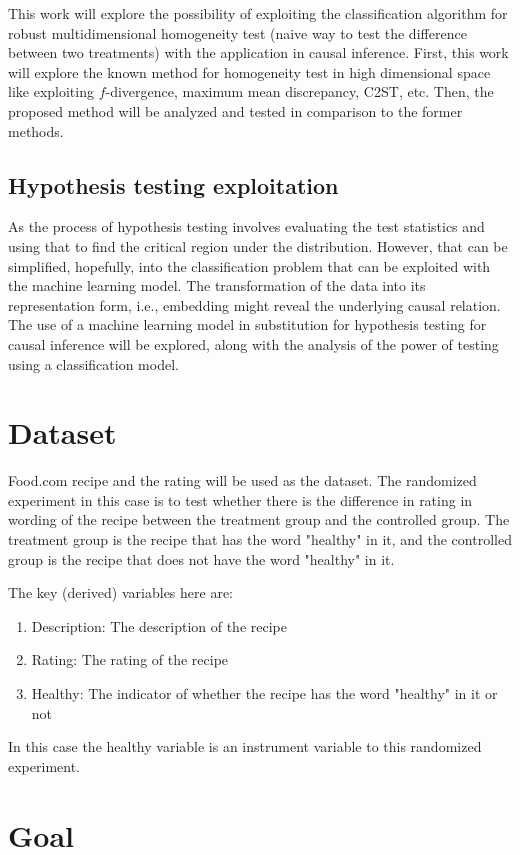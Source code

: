 \documentclass{article}
\begin{document}
This work will explore the possibility of exploiting the classification algorithm for robust multidimensional homogeneity test (naive way to test the difference between two treatments) with the application in causal inference.
First, this work will explore the known method for homogeneity test in high dimensional space like exploiting $f$-divergence\cite{fdiv}, maximum mean discrepancy\cite{mmd}, C2ST\cite{c2st}, etc. 
Then, the proposed method will be analyzed and tested in comparison to the former methods.
\subsection{Hypothesis testing exploitation}
As the process of hypothesis testing involves evaluating the test statistics and using that 
to find the critical region under the distribution. However, that can be simplified, hopefully, 
into the classification problem that can be exploited with the machine learning model. 
The transformation of the data into its representation form, i.e., embedding might reveal 
the underlying causal relation. The use of a machine learning model in substitution for 
hypothesis testing for causal inference will be explored, along with the analysis of the power 
of testing using a classification model.


\section{Dataset}
Food.com\cite{food} recipe and the rating will be used as the dataset. The randomized experiment in this case is to test whether there is the difference in rating
in wording of the recipe between the treatment group and the controlled group. The treatment group is the recipe that has the word "healthy" in it, and the controlled group is the recipe that does not have the word "healthy" in it.

The key (derived) variables here are:
\begin{enumerate}
    \item Description: The description of the recipe
    \item Rating: The rating of the recipe
    \item Healthy: The indicator of whether the recipe has the word "healthy" in it or not
\end{enumerate}
In this case the healthy variable is an instrument variable to this randomized experiment.
\section{Goal}
\end{document}
